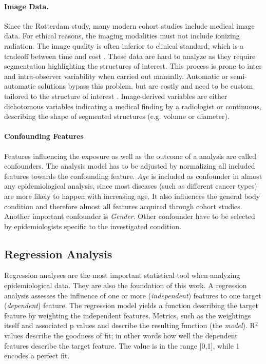 \documentclass[journal]{style/vgtc} 			          %
\begin{document}
\paragraph{Image Data.}
Since the Rotterdam study, many modern cohort studies include medical image data.
For ethical reasons, the imaging modalities must not include ionizing radiation.
The image quality is often inferior to clinical standard, which is a tradeoff between time and cost \cite{Preim2014}.
These data are hard to analyze as they require segmentation highlighting the structures of interest.
This process is prone to inter and intra-observer variability when carried out manually.
Automatic or semi-automatic solutions bypass this problem, but are costly and need to be custom tailored to the structure of interest \cite{Toennies2015}.
Image-derived variables are either dichotomous variables indicating a medical finding by a radiologist or continuous, describing the shape of segmented structures (e.g. volume or diameter).

\paragraph{Confounding Features}
Features influencing the exposure as well as the outcome of a analysis are called confounders.
The analysis model has to be adjusted by normalizing all included features towards the confounding feature.
\emph{Age} is included as confounder in almost any epidemiological analysis, since most diseases (such as different cancer types) are more likely to happen with increasing age.
It also influences the general body condition and therefore almost all features acquired through cohort studies.
Another important confounder is \emph{Gender}.
Other confounder have to be selected by epidemiologists specific to the investigated condition.

\subsection{Regression Analysis} \label{sec:RegressionAnalysis}
Regression analyses are the most important statistical tool when analyzing epidemiological data.
They are also the foundation of this work.
A regression analysis assesses the influence of one or more (\emph{independent}) features to one target (\emph{dependent}) feature.
The regression model yields a function describing the target feature by weighting the independent features.
Metrics, such as the weightings itself and associated p values and describe the resulting function (the \emph{model}).
R$^2$ values describe the goodness of fit; in other words how well the dependent features describe the target feature.
The value is in the range [0,1], while 1 encodes a perfect fit.
\end{document}
